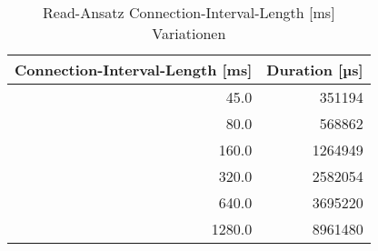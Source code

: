 \begin{table}
\centering
\caption{Read-Ansatz Connection-Interval-Length [ms] Variationen}
\label{table:readdetailconnectionintervalchange}
\begin{tabular}{rr}
\toprule
 Connection-Interval-Length [ms] &  Duration [µs] \\
\midrule
          45.0 &    351194 \\
          80.0 &    568862 \\
         160.0 &   1264949 \\
         320.0 &   2582054 \\
         640.0 &   3695220 \\
        1280.0 &   8961480 \\
\bottomrule
\end{tabular}
\end{table}
